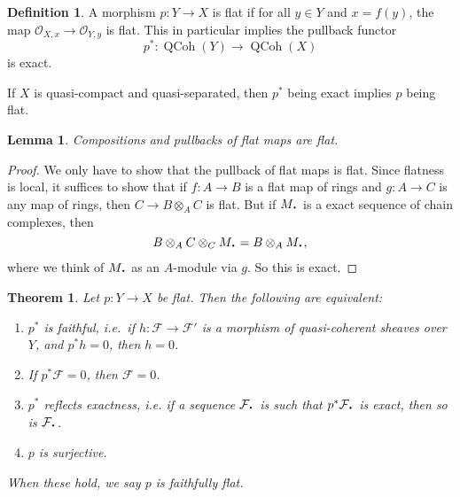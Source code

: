 \documentclass{shortart}
\newtheorem*{thm}{Theorem}
\newtheorem*{lemma}{Lemma}
\theoremstyle{definition}
\newtheorem*{defi}{Definition}
\DeclareMathOperator\QCoh{QCoh}
\newcommand*{\Cdot}{{\raisebox{-0.25ex}{\scalebox{1.5}{$\cdot$}}}}
\begin{document}
\begin{defi}
  A morphism $p: Y \to X$ is flat if for all $y \in Y$ and $x = f(y)$, the map $\mathcal{O}_{X, x} \to \mathcal{O}_{Y, y}$ is flat. This in particular implies the pullback functor
  \[
    p^*: \QCoh(Y) \to \QCoh(X)
  \]
  is exact.
\end{defi}
If $X$ is quasi-compact and quasi-separated, then $p^*$ being exact implies $p$ being flat.

\begin{lemma}
  Compositions and pullbacks of flat maps are flat.
\end{lemma}
\begin{proof}
  We only have to show that the pullback of flat maps is flat. Since flatness is local, it suffices to show that if $f: A \to B$ is a flat map of rings and $g:A \to C$ is any map of rings, then $C \to B \otimes_A C$ is flat. But if $M_\Cdot$ is a exact sequence of chain complexes, then
  \[
    B \otimes_A C \otimes_C M_\Cdot = B \otimes_A M_\Cdot,
  \]
  where we think of $M_\Cdot$ as an $A$-module via $g$. So this is exact.
\end{proof}

\begin{thm}
  Let $p: Y \to X$ be flat. Then the following are equivalent:
  \begin{enumerate}
    \item $p^*$ is faithful, i.e.\ if $h: \mathcal{F} \to \mathcal{F}'$ is a morphism of quasi-coherent sheaves over $Y$, and $p^*h = 0$, then $h = 0$.
    \item If $p^* \mathcal{F} = 0$, then $\mathcal{F} = 0$.
    \item $p^*$ reflects exactness, i.e. if a sequence $\mathcal{F}_\Cdot$ is such that $p^* \mathcal{F}_\Cdot$ is exact, then so is $\mathcal{F}_\Cdot$.
    \item $p$ is surjective.
  \end{enumerate}
  When these hold, we say $p$ is \emph{faithfully flat}.
\end{thm}
\end{document}
